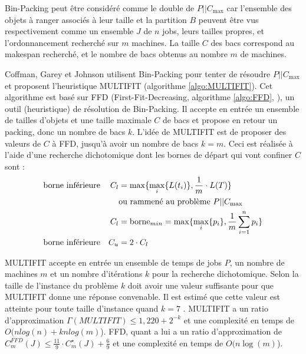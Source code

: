 \documentclass[a4paper,12pt]{report}
\theoremstyle{plain}				%
\theoremstyle{definition}				%
\newcommand\problemGrahamP{$P||C_{\max}$\xspace}
\begin{document}
Bin-Packing peut être considéré comme le double de \problemGrahamP 
  car l'ensemble des objets à ranger associés à leur taille et la partition $B$ 
  peuvent être vus respectivement comme 
  un ensemble $J$ de $n$ jobs, leurs tailles propres, 
  et l'ordonnancement recherché sur $m$ machines.
La taille $C$ des bacs correspond au makespan recherché, 
  et le nombre de bacs obtenus au nombre $m$ de machines.
  
\bigskip
Coffman, Garey et Johnson \cite{coffman1978application} utilisent Bin-Packing 
  pour tenter de résoudre \problemGrahamP et proposent 
  l'heuristique MULTIFIT (algorithme \ref{algo:MULTIFIT}). 
Cet algorithme est basé sur FFD 
  (First-Fit-Decreasing, algorithme \ref{algo:FFD}, \cite{rieck2021basic}), 
  un outil (heuristique) de résolution de Bin-Packing. 
Il accepte en entrée un ensemble de tailles d'objets et une taille maximale $C$ de bacs 
  et propose en retour un packing, donc un nombre de bacs $k$.
L'idée de MULTIFIT est de proposer des valeurs de $C$ à FFD, jusqu'à avoir un nombre de bacs $k=m$.
Ceci est réalisée à l'aide d'une recherche dichotomique dont les bornes de départ qui vont confiner $C$ sont : 
\begin{align*}
&\textnormal{borne inférieure} 	&C_l 	&= \max \{ \max_i \{ L(t_i) \}, \frac{1}{m} \cdot L(T) \} \\
& 								& 		& \textnormal{ou rammené au problème \problemGrahamP} \\	 
& 								& C_l 	&= \text{borne}_{min} = \max \{ \max_i\{p_i\}, \frac{1}{m} \sum_{i=1}^{n} p_i \} \\
&\textnormal{borne inférieure} 	&C_u 	&= 2 \cdot C_l 
\end{align*}

MULTIFIT accepte en entrée un ensemble de temps de jobs $P$, 
  un nombre de machines $m$ et 
  un nombre d'itérations $k$ pour la recherche dichotomique.
Selon la taille de l'instance du problème $k$ doit avoir une valeur suffisante pour que 
  MULTIFIT donne une réponse convenable. 
Il est estimé que cette valeur est atteinte pour toute taille d'instance 
  quand $k=7$ \cite{coffman1978application}.
MULTIFIT a 
  un ratio d'approximation $\Gamma(MULTIFIT) \leq 1,220 + 2^{-k}$ et 
  une complexité en temps de $ O(n log(n) + kn log(m)$).
FFD, quant a lui a 
  un ratio d'approximation de $C_m^{FFD}(J) \leq \frac{11}{9} \cdot C_m^\star(J) + \frac{6}{9}$ 
  \cite{dosa2007tight} et une complexité en temps de $ O(n \log(m)$).
\end{document}
